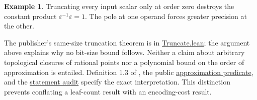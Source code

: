 \documentclass[11pt,letterpaper]{article}
\theoremstyle{definition}\newtheorem{definition}[theorem]{Definition}\newtheorem{example}[theorem]{Example}
\theoremstyle{remark}\newtheorem{remark}[theorem]{Remark}
\newcommand{\pub}[3]{\href{https://github.com/anthropics/formal-math/blob/11b6c7e3c927df2658f513b6b68ea7f8929c62c5/vp-vnp/#1\#L#2}{#3}}
\newcommand{\aud}[2]{\href{https://github.com/nousentllc/VP-VNP-Review/blob/567303d0bcf4f9d54390437b137752446e58ccd6/#1}{#2}}
\begin{document}
\begin{example} Truncating every input scalar only at order zero destroys the constant product $\varepsilon^{-1}\varepsilon=1$. The pole at one operand forces greater precision at the other.\end{example}
The publisher's same-size truncation theorem is in \pub{Nc/Rate/Truncate.lean}{241}{Truncate.lean}; the argument above explains why no bit-size bound follows. Neither a claim about arbitrary topological closures of rational points nor a polynomial bound on the order of approximation is entailed. Definition 1.3 of \cite{claude}, the public \pub{Statement.lean}{53}{approximation predicate}, and the \aud{passes/statement-correspondence.md}{statement audit} specify the exact interpretation. This distinction prevents conflating a leaf-count result with an encoding-cost result.
\end{document}
